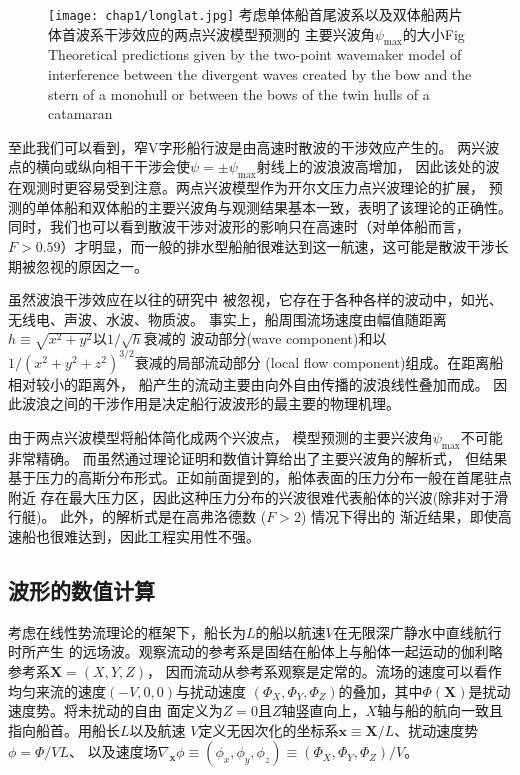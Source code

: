 \begin{figure}[htp]
  \centering
  \captionstyle{\centering}
  \texttt{[image: chap1/longlat.jpg]}
  {考虑单体船首尾波系以及双体船两片体首波系干涉效应的两点兴波模型预测的
    主要兴波角$\psi_{\max}$的大小}{Fig}
    {Theoretical predictions given by the two-point wavemaker model 
      of interference between the divergent waves created by the bow 
      and the stern of a monohull or between the bows of the twin 
    hulls of a catamaran}
\end{figure}

至此我们可以看到，窄V字形船行波是由高速时散波的干涉效应产生的。
两兴波点的横向或纵向相干干涉会使$\psi=\pm\psi_{\max}$射线上的波浪波高增加，
因此该处的波在观测时更容易受到注意。两点兴波模型作为开尔文压力点兴波理论的扩展，
预测的单体船和双体船的主要兴波角与观测结果基本一致，表明了该理论的正确性。
同时，我们也可以看到散波干涉对波形的影响只在高速时（对单体船而言，$F>0.59$）才明显，而一般的排水型船舶很难达到这一航速，这可能是散波干涉长期被忽视的原因之一。

虽然波浪干涉效应在以往的研究中\supercite{Mei1991Note,Zhu2008Resonant,Fang2011Kelvin,Rabaud2013Ship,Darmon2014Kelvin}
被忽视，它存在于各种各样的波动中，如光、无线电、声波、水波、物质波。
事实上，船周围流场速度由幅值随距离$h\equiv\sqrt{x^2+y^2}$以$1/\sqrt{h}$衰减的
波动部分(wave component)和以$1/(x^2+y^2+z^2)^{3/2}$衰减的局部流动部分
(local flow component)组成。在距离船相对较小的距离外，
船产生的流动主要由向外自由传播的波浪线性叠加而成。
因此波浪之间的干涉作用是决定船行波波形的最主要的物理机理。

由于两点兴波模型\supercite{Noblesse2014Why}将船体简化成两个兴波点，
模型预测的主要兴波角$\psi_{\max}$不可能非常精确。
而\parencite{Darmon2014Kelvin}虽然通过理论证明和数值计算给出了主要兴波角的解析式，
但结果基于压力的高斯分布形式。正如前面提到的，船体表面的压力分布一般在首尾驻点附近
存在最大压力区，因此这种压力分布的兴波很难代表船体的兴波(除非对于滑行艇)。
此外，\parencite{Darmon2014Kelvin}的解析式是在高弗洛德数 ($F>2$) 情况下得出的
渐近结果，即使高速船也很难达到，因此工程实用性不强。

\subsection{波形的数值计算}
考虑在线性势流理论的框架下，船长为$L$的船以航速$V$在无限深广静水中直线航行时所产生
的远场波。观察流动的参考系是固结在船体上与船体一起运动的伽利略参考系$\mathbf{X}=(X,Y,Z)$，
因而流动从参考系观察是定常的。流场的速度可以看作均匀来流的速度$(-V,0,0)$与扰动速度
$(\Phi_X,\Phi_Y,\Phi_Z)$的叠加，其中$\Phi(\mathbf{X})$是扰动速度势。将未扰动的自由
面定义为$Z=0$且$Z$轴竖直向上，$X$轴与船的航向一致且指向船首。用船长$L$以及航速
$V$定义无因次化的坐标系$\mathbf{x}\equiv\mathbf{X}/L$、扰动速度势$\phi=\Phi/VL$、
以及速度场$\nabla_\mathbf{x}\phi\equiv(\phi_x,\phi_y,\phi_z)\equiv(\Phi_X,\Phi_Y,\Phi_Z)/V$。

